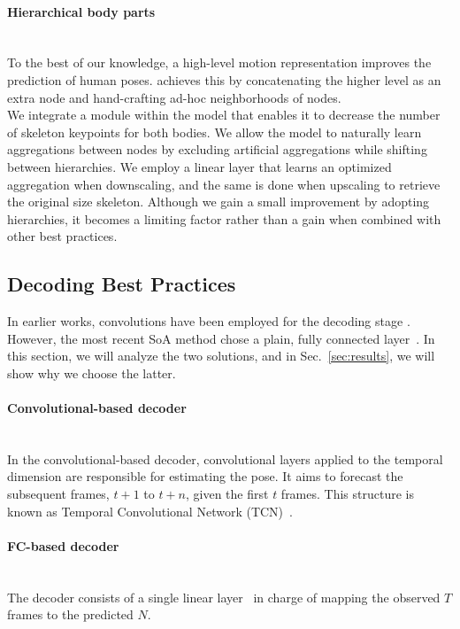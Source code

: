 \documentclass[10pt,twocolumn,letterpaper]{article}
\begin{document}
\paragraph{Hierarchical body parts} ~\\
To the best of our knowledge, a high-level motion representation improves the prediction of human poses\cite{Li_2020_CVPR}.
\cite{Dang21} achieves this by concatenating the higher level as an extra node and hand-crafting ad-hoc neighborhoods of nodes. \\
We integrate a module within the model that enables it to decrease the number of skeleton keypoints for both bodies.
We allow the model to naturally learn aggregations between nodes by excluding artificial aggregations while shifting between hierarchies.
We employ a linear layer that learns an optimized aggregation when downscaling, and the same is done when upscaling to retrieve the original size skeleton. Although we gain a small improvement by adopting hierarchies, it becomes a limiting factor rather than a gain when combined with other best practices.


\subsection{Decoding Best Practices}\label{ssec:dec}
In earlier works, convolutions have been employed for the decoding stage \cite{gehring2017convolutional, luo2018faf, sofianos21}. However, the most recent SoA method chose a plain, fully connected layer~\cite{guo2022back}. In this section, we will analyze the two solutions, and in Sec.~\ref{sec:results}, we will show why we choose the latter.

\paragraph{Convolutional-based decoder}\label{par:conv} ~\\
In the convolutional-based decoder, convolutional layers applied to the temporal dimension are responsible for estimating the pose. It aims to forecast the subsequent frames, $t+1$ to $t+n$, given the first $t$ frames. This structure is known as Temporal Convolutional Network (TCN)~\cite{gehring2017convolutional, luo2018faf, sofianos21}.


\paragraph{FC-based decoder}  \greencheck \label{par:fc}\\
The decoder consists of a single linear layer~\cite{guo2022back} in charge of mapping the observed $T$ frames to the predicted $N$.
\end{document}
